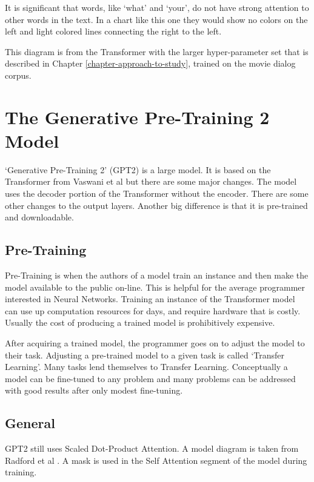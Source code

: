 It is significant that words, like `what' and `your', do not have strong attention to other words in the text. In a chart like this one they would show no colors on the left and light colored lines connecting the right to the left.

This diagram is from the Transformer with the larger hyper-parameter set that is described in Chapter \ref{chapter-approach-to-study}, trained on the movie dialog corpus.


\section{The Generative Pre-Training 2 Model}

`Generative Pre-Training 2' (\ac{GPT2}) is a large model. It is based on the Transformer from Vaswani et al \cite{Vaswani2017AttentionIA} but there are some major changes. The model uses the decoder portion of the Transformer without the encoder. There are some other changes to the output layers. Another big difference is that it is pre-trained and downloadable.

\subsection{Pre-Training}
Pre-Training is when the authors of a model train an instance and then make the model available to the public on-line. This is helpful for the average programmer interested in Neural Networks. Training an instance of the Transformer model can use up computation resources for days, and require hardware that is costly. Usually the cost of producing a trained model is prohibitively expensive.

After acquiring a trained model, the programmer goes on to adjust the model to their task. Adjusting a pre-trained model to a given task is called `Transfer Learning'. Many tasks lend themselves to Transfer Learning. Conceptually a model can be fine-tuned to any problem and many problems can be addressed with good results after only modest fine-tuning.


\subsection{General}
GPT2 still uses Scaled Dot-Product Attention. A model diagram is taken from Radford et al \cite{radford2018improving}. A mask is used in the Self Attention segment of the model during training.

